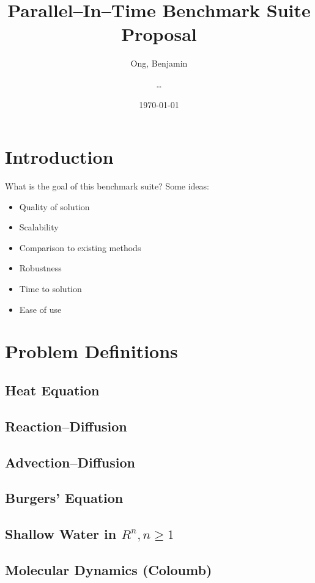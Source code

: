 \documentclass[12pt]{article}
\title{Parallel--In--Time Benchmark Suite Proposal}
\author{Ong, Benjamin \and \ldots}
\date{\today}
\begin{document}
\maketitle

\section{Introduction}
What is the goal of this benchmark suite?  Some ideas:
\begin{itemize}
\item Quality of solution
\item Scalability
\item Comparison to existing methods
\item Robustness
\item Time to solution
\item Ease of use
\end{itemize}

\section{Problem Definitions}

\subsection{Heat Equation}

\subsection{Reaction--Diffusion}

\subsection{Advection--Diffusion}

\subsection{Burgers' Equation}

\subsection{Shallow Water in $R^{n}, n \ge 1$ }

\subsection{Molecular Dynamics (Coloumb)}
\end{document}
